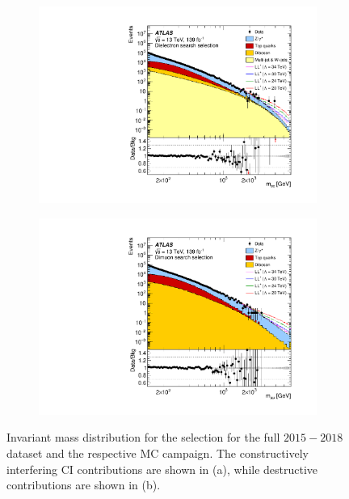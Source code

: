 \begin{figure}[]
    \centering
    \begin{subfigure}[b]{0.49\textwidth}
        \centering
        \includegraphics[width=\textwidth]{figures/analysis/datamc/dataMCcompare/dest_ee_m_eebins_log100.pdf}
        \caption{}
        \label{fig:datamc:mmconst}
    \end{subfigure}
    \begin{subfigure}[b]{0.49\textwidth}
        \centering
        \includegraphics[width=\textwidth]{figures/analysis/datamc/dataMCcompare/dest_uu_m_uubins_log100.pdf}
        \caption{}
        \label{fig:datamc:mmdest}
    \end{subfigure}
    \caption[Invariant mass distributions for \mumu channel]{Invariant mass distribution for the \mumu selection for the full $2015-2018$ dataset and the respective MC campaign. The constructively interfering CI contributions are shown in (a), while destructive contributions are shown in (b).}
    \label{fig:datamc:mmcompare}
\end{figure}

